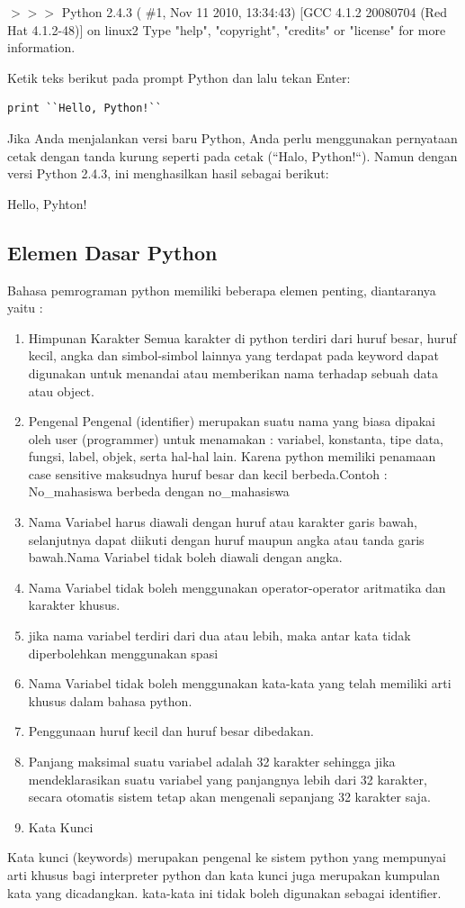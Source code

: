 \begin{enumerate}
$>$$>$$>$ Python 2.4.3 ( $  \#  $1, Nov 11 2010, 13:34:43) [GCC 4.1.2 20080704 (Red Hat 4.1.2-48)] on linux2 Type "help", "copyright", "credits" or "license" for more information.

Ketik teks berikut pada prompt Python dan lalu tekan Enter:

\begin{verbatim}
print ``Hello, Python!``
\end{verbatim}

Jika Anda menjalankan versi baru Python, Anda perlu menggunakan pernyataan cetak dengan tanda kurung seperti pada cetak (``Halo, Python!``). Namun dengan versi Python 2.4.3, ini menghasilkan hasil sebagai berikut:

Hello, Pyhton!



\subsection{Elemen Dasar Python}
Bahasa pemrograman python memiliki beberapa elemen penting, diantaranya yaitu :
\begin{enumerate}
	\item Himpunan Karakter
		Semua karakter di python terdiri dari huruf besar, huruf kecil, angka dan simbol-simbol lainnya yang terdapat pada keyword dapat digunakan untuk menandai atau memberikan nama terhadap sebuah data atau object.
	\item Pengenal 
		Pengenal (identifier) merupakan suatu nama yang biasa dipakai oleh user (programmer) untuk menamakan : variabel, konstanta, tipe data, fungsi, label, objek, serta hal-hal lain. Karena python memiliki penamaan case sensitive maksudnya huruf besar dan kecil berbeda.Contoh : No\_mahasiswa berbeda dengan no\_mahasiswa
	\item Nama Variabel harus diawali dengan huruf atau karakter garis bawah, selanjutnya dapat diikuti dengan huruf maupun angka atau tanda garis bawah.Nama Variabel tidak boleh diawali dengan angka.
	\item Nama Variabel tidak boleh menggunakan operator-operator aritmatika dan karakter khusus.
	\item jika nama variabel terdiri dari dua atau lebih, maka antar kata tidak diperbolehkan menggunakan spasi
	\item Nama Variabel tidak boleh menggunakan kata-kata yang telah memiliki arti khusus dalam bahasa python.
	\item Penggunaan huruf kecil dan huruf besar dibedakan.
	\item Panjang maksimal suatu variabel adalah 32 karakter sehingga jika mendeklarasikan suatu variabel yang panjangnya lebih dari 32 karakter, secara otomatis sistem tetap akan mengenali sepanjang 32 karakter saja.
	\item Kata Kunci
\end{enumerate}
		Kata kunci (keywords) merupakan pengenal ke sistem python yang mempunyai arti khusus bagi interpreter python dan kata kunci juga merupakan kumpulan kata yang dicadangkan. kata-kata ini tidak boleh digunakan sebagai identifier.




\end{enumerate}
